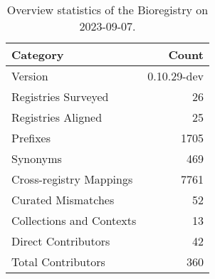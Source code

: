 \begin{table}
\caption{Overview statistics of the Bioregistry on 2023-09-07.}
\label{tab:bioregistry-summary}
\begin{tabular}{lr}
\toprule
Category & Count \\
\midrule
Version & 0.10.29-dev \\
Registries Surveyed & 26 \\
Registries Aligned & 25 \\
Prefixes & 1705 \\
Synonyms & 469 \\
Cross-registry Mappings & 7761 \\
Curated Mismatches & 52 \\
Collections and Contexts & 13 \\
Direct Contributors & 42 \\
Total Contributors & 360 \\
\bottomrule
\end{tabular}
\end{table}
